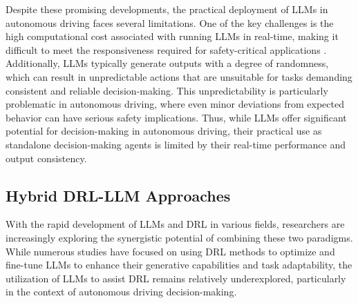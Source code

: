 Despite these promising developments, the practical deployment of LLMs in autonomous driving faces several limitations. One of the key challenges is the high computational cost associated with running LLMs in real-time, making it difficult to meet the responsiveness required for safety-critical applications \cite{cui2024survey}. Additionally, LLMs typically generate outputs with a degree of randomness, which can result in unpredictable actions that are unsuitable for tasks demanding consistent and reliable decision-making. This unpredictability is particularly problematic in autonomous driving, where even minor deviations from expected behavior can have serious safety implications. Thus, while LLMs offer significant potential for decision-making in autonomous driving, their practical use as standalone decision-making agents is limited by their real-time performance and output consistency.


\subsection{Hybrid DRL-LLM Approaches}

With the rapid development of LLMs and DRL in various fields, researchers are increasingly exploring the synergistic potential of combining these two paradigms. While numerous studies have focused on using DRL methods to optimize and fine-tune LLMs to enhance their generative capabilities and task adaptability, the utilization of LLMs to assist DRL remains relatively underexplored, particularly in the context of autonomous driving decision-making.

